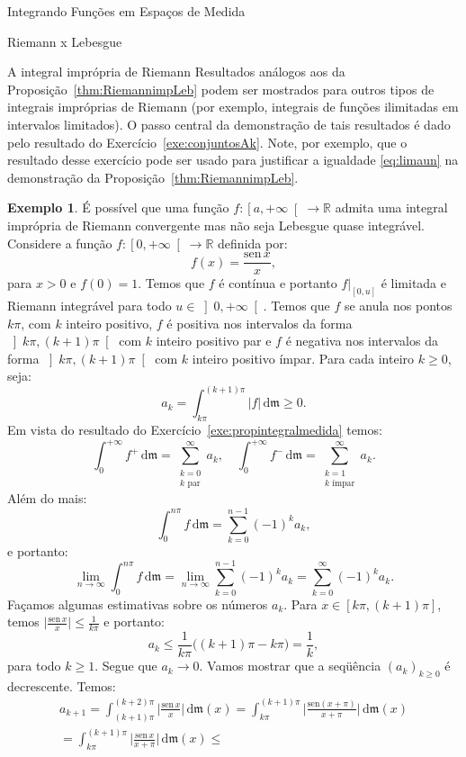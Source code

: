 \documentclass[oneside,final,11pt]{amsbook}
\newcommand{\R}{\mathds R}
\newcommand{\leb}{\mathfrak m}
\newcommand{\dd}{\mathrm d}
\newcommand{\sen}{\mathrm{sen}}
\theoremstyle{remark}\newtheorem{exercise}{Exercício}[chapter]
\theoremstyle{remark}\newtheorem{*exercise}[exercise]{\hbox to 0pt{\hskip 0pt minus 1fil*}Exercício}
\theoremstyle{definition}\newtheorem{exdefin}{Definição}[chapter]
\theoremstyle{plain}\newtheorem{teo}{Teorema}[section]
\theoremstyle{plain}\newtheorem{lem}[teo]{Lema}
\theoremstyle{plain}\newtheorem{prop}[teo]{Proposição}
\theoremstyle{plain}\newtheorem{cor}[teo]{Corolário}
\theoremstyle{definition}\newtheorem{defin}[teo]{Definição}
\theoremstyle{remark}\newtheorem{rem}[teo]{Observação}
\theoremstyle{definition}\newtheorem{notation}[teo]{Notação}
\theoremstyle{definition}\newtheorem{convention}[teo]{Convenção}
\theoremstyle{definition}\newtheorem{example}[teo]{Exemplo}
\numberwithin{section}{chapter}
\numberwithin{equation}{section}
\begin{document}
\begin{chapter}{Integrando Funções em Espaços de Medida}
\begin{section}{Riemann x Lebesgue}
\begin{subsection}{A integral imprópria de Riemann}
Resultados análogos aos da Proposição~\ref{thm:RiemannimpLeb} podem ser mostrados para outros tipos
de integrais impróprias de Riemann (por exemplo, integrais de funções ilimitadas
em intervalos limitados). O passo central da demonstração de tais resultados
é dado pelo resultado do Exercício~\ref{exe:conjuntosAk}. Note, por exemplo,
que o resultado desse exercício pode ser usado para justificar a igualdade
\eqref{eq:limaun} na demonstração da Proposição~\ref{thm:RiemannimpLeb}.

\begin{example}\label{exa:senxx}
É possível que uma função $f:\left[a,+\infty\right[\to\R$ admita uma integral imprópria
de Riemann convergente mas não seja Lebesgue quase integrável.
Considere a função $f:\left[0,+\infty\right[\to\R$ definida por:
\[f(x)=\frac{\sen\,x}x,\]
para $x>0$ e $f(0)=1$. Temos que $f$ é contínua e portanto $f\vert_{[0,u]}$ é limitada e Riemann
integrável para todo $u\in\left]0,+\infty\right[$. Temos que $f$ se anula nos pontos $k\pi$,
com $k$ inteiro positivo, $f$ é positiva nos intervalos da forma $\left]k\pi,(k+1)\pi\right[$
com $k$ inteiro positivo par e $f$ é negativa nos intervalos da forma $\left]k\pi,(k+1)\pi\right[$
com $k$ inteiro positivo ímpar. Para cada inteiro $k\ge0$, seja:
\[a_k=\int_{k\pi}^{(k+1)\pi}\vert f\vert\,\dd\leb\ge0.\]
Em vista do resultado do Exercício~\ref{exe:propintegralmedida} temos:
\begin{equation}\label{eq:kparimpar}
\int_0^{+\infty}f^+\,\dd\leb=\sum_{\substack{k=0\\\text{$k$ par}}}^\infty a_k,\quad
\int_0^{+\infty}f^-\,\dd\leb=\sum_{\substack{k=1\\\text{$k$ ímpar}}}^\infty a_k.
\end{equation}
Além do mais:
\[\int_0^{n\pi}f\,\dd\leb=\sum_{k=0}^{n-1}(-1)^ka_k,\]
e portanto:
\[\lim_{n\to\infty}\int_0^{n\pi}f\,\dd\leb=\lim_{n\to\infty}\sum_{k=0}^{n-1}(-1)^ka_k=
\sum_{k=0}^\infty(-1)^ka_k.\]
Façamos algumas estimativas sobre os números $a_k$. Para $x\in[k\pi,(k+1)\pi]$, temos
$\big\vert\frac{\sen\,x}x\big\vert\le\frac1{k\pi}$ e portanto:
\[a_k\le\frac1{k\pi}\big((k+1)\pi-k\pi\big)=\frac1k,\]
para todo $k\ge1$. Segue que $a_k\to0$. Vamos mostrar que a seqüência $(a_k)_{k\ge0}$
é decrescente. Temos:
\begin{multline*}
a_{k+1}=\int_{(k+1)\pi}^{(k+2)\pi}\Big\vert\frac{\sen\,x}x\Big\vert\,\dd\leb(x)
=\int_{k\pi}^{(k+1)\pi}\Big\vert\frac{\sen(x+\pi)}{x+\pi}\Big\vert\,\dd\leb(x)\\
=\int_{k\pi}^{(k+1)\pi}\Big\vert\frac{\sen\,x}{x+\pi}\Big\vert\,\dd\leb(x)\le

\end{multline*}
\end{example}
\end{subsection}
\end{section}
\end{chapter}
\end{document}
